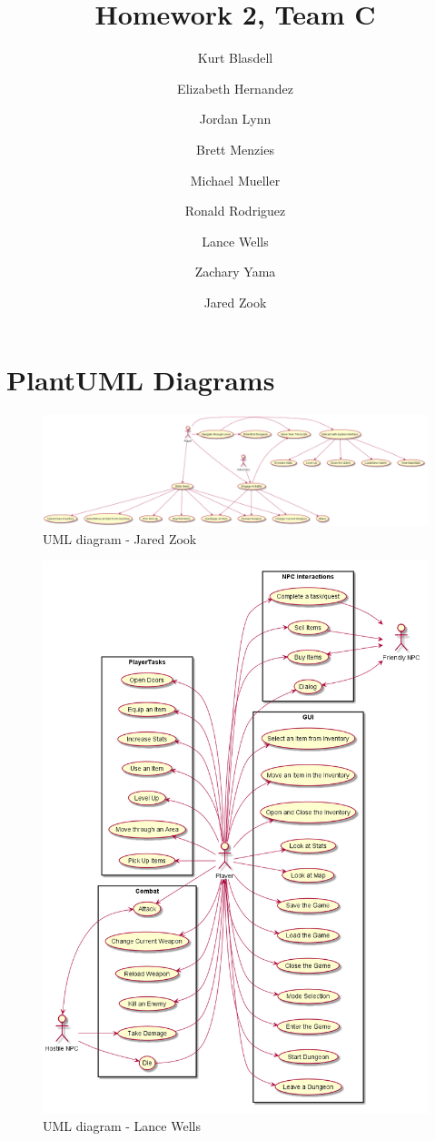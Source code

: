 \documentclass[12pt]{report}
\title{Homework 2, Team C}
\author{ Kurt Blasdell 
\and Elizabeth Hernandez 
\and Jordan Lynn 
\and Brett Menzies 
\and Michael Mueller 
\and Ronald Rodriguez 
\and Lance Wells 
\and Zachary Yama 
\and Jared Zook 
}
\begin{document}
    \maketitle

\tableofcontents{}

\chapter{PlantUML Diagrams}
\begin{figure}
	\includegraphics[scale=0.25,left]{uml-Jared_Zook.png}
	\caption{UML diagram - Jared Zook}
\end{figure}

\begin{figure}
	\centering
	\includegraphics[scale=0.4,center]{uml-Lance_Wells.png}
	\caption{UML diagram - Lance Wells}
\end{figure}
\end{document}
